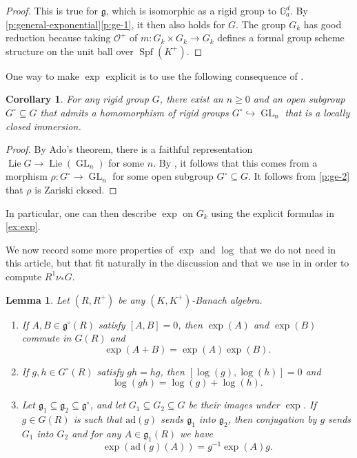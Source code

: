 \documentclass[11pt]{amsart}
\numberwithin{equation}{section}
\newtheorem{Lemma}[thm]{Lemma}
\newtheorem{Corollary}[thm]{Corollary}
\theoremstyle{definition}
\theoremstyle{remark}
\newcommand{\G}{\mathbb{G}}
\renewcommand{\O}{\mathcal{O}}
\newcommand{\mg}{\mathfrak{g}}
\newcommand{\GL}{\operatorname{GL}}
\newcommand{\ad}{\mathrm{ad}}
\newcommand{\Spf}{\operatorname{Spf}}
\begin{document}
\begin{proof}
	This is true for $\mathfrak g$, which is isomorphic as a rigid group to $\G_a^d$. By \cref{p:general-exponential}\eqref{p:ge-1}, it then also holds for $G$. The group $G_k$ has good reduction because taking $\O^+$ of $m\colon G_k\times G_k\to G_k$ defines a formal group scheme structure on the unit ball over $\Spf(K^+)$.
\end{proof}

One way to make $\exp$ explicit is to use the following consequence of  . 

\begin{Corollary}
	For any rigid group $G$, there exist an $n\geq 0$ and an open subgroup $G^\circ\subseteq G$ that admits a homomorphism of rigid groups $G^\circ\hookrightarrow \GL_n$ that is a locally closed immersion.
\end{Corollary}

\begin{proof}
	By Ado's theorem, there is a faithful representation $\operatorname{Lie} G\to \operatorname{Lie}(\GL_n)$ for some $n$. By , it follows that this comes from a morphism $\rho\colon G^\circ\to \GL_n$ for some open subgroup $G^\circ\subseteq G$. It follows from \eqref{p:ge-2} that $\rho$ is Zariski closed.
\end{proof}

In particular, one can then describe $\exp$ on $G_k$ using the explicit formulas in \cref{ex:exp}.

We now record some more properties of $\exp$ and $\log$ that we do not need in this article, but that fit naturally in the discussion and that we  use in \cite{heuer-sheafified-paCS} in order to compute $R^1\nu_{\ast}G$.

\begin{Lemma}\label{l:exp-on-matrix}
	Let $(R,R^+)$ be any $(K,K^+)$-Banach algebra.
	\begin{enumerate}
		\item\label{l:eom-1}
		If $A,B\in \mathfrak g^\circ(R)$ satisfy $[A,B]=0$, then $\exp(A)$ and $\exp(B)$ commute in $G(R)$ and 
		\[\exp(A+B)=\exp(A)\exp(B).\]
		\item\label{l:eom-2} If $g,h\in G^\circ(R)$ satisfy $gh=hg$, then $[\log(g),\log(h)]=0$ and 
		\[\log(gh)=\log(g)+\log(h).\]
		\item\label{l:eom-3} Let $\mathfrak g_1\subseteq\mathfrak g_2\subseteq \mg^\circ$, and let $G_1\subseteq G_2\subseteq G$ be their images under $\exp$. If $g\in G(R)$ is such that $\ad(g)$ sends $\mathfrak g_{1}$ into $\mathfrak g_{2}$, then conjugation by $g$ sends $G_{1}$ into $G_{2}$ and for any $A\in \mg_{1}(R)$ we have
		\[ \exp(\ad(g)(A))=g^{-1}\exp(A)g.\]
	\end{enumerate}
\end{Lemma}
\end{document}
